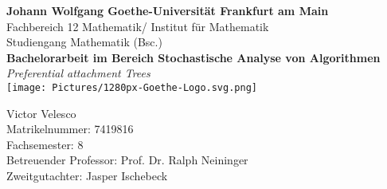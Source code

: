 
\begin{titlepage}
\vspace*{1cm}
\begin{center}
\large
\textbf{Johann Wolfgang Goethe-Universität Frankfurt am Main}\\
Fachbereich 12 Mathematik/ Institut für Mathematik\\
Studiengang Mathematik (Bsc.)\\
\vspace{1cm}
\Large
\textbf{Bachelorarbeit im Bereich Stochastische Analyse von Algorithmen}\\
\vspace{0.5cm}
\Large
\textit{Preferential attachment Trees}\\
\vspace{3cm}
\texttt{[image: Pictures/1280px-Goethe-Logo.svg.png]}
\vspace{3cm}

\end{center}

Victor Velesco\\
Matrikelnummer: 7419816\\
Fachsemester: 8\\ 
Betreuender Professor: Prof. Dr. Ralph Neininger\\
Zweitgutachter: Jasper Ischebeck\\
\end{titlepage}
